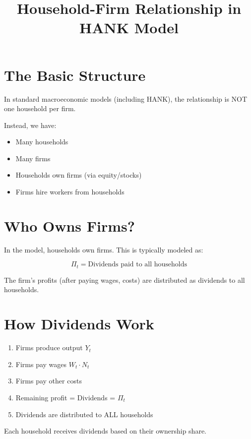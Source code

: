 \documentclass[12pt,a4paper]{article}
\title{Household-Firm Relationship in HANK Model}
\date{}
\begin{document}
\maketitle

\section{The Basic Structure}

In standard macroeconomic models (including HANK), the relationship is NOT one household per firm.

Instead, we have:
\begin{itemize}
    \item Many households
    \item Many firms
    \item Households own firms (via equity/stocks)
    \item Firms hire workers from households
\end{itemize}

\section{Who Owns Firms?}

In the model, households own firms. This is typically modeled as:

\begin{equation}
\Pi_t = \text{Dividends paid to all households}
\end{equation}

The firm's profits (after paying wages, costs) are distributed as dividends to all households.

\section{How Dividends Work}

\begin{enumerate}
    \item Firms produce output $Y_t$
    \item Firms pay wages $W_t \cdot N_t$
    \item Firms pay other costs
    \item Remaining profit = Dividends = $\Pi_t$
    \item Dividends are distributed to ALL households
\end{enumerate}

Each household receives dividends based on their ownership share.
\end{document}
